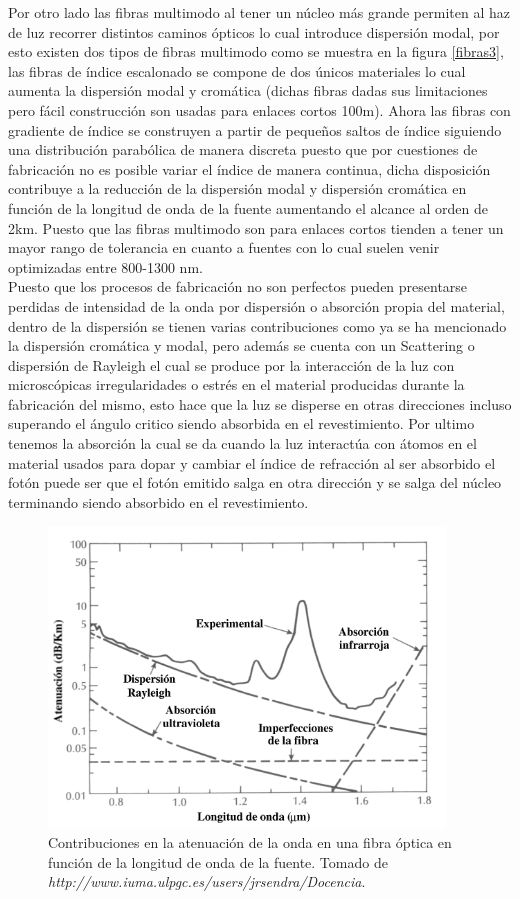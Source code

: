 Por otro lado las fibras multimodo al tener un núcleo más grande permiten al haz de luz recorrer distintos caminos ópticos lo cual introduce dispersión modal, por esto existen dos tipos de fibras multimodo como se muestra en la figura \ref{fibras3}, las fibras de índice escalonado se compone de dos únicos materiales lo cual aumenta la dispersión modal y cromática (dichas fibras dadas sus limitaciones pero fácil construcción son usadas para enlaces cortos 100m). Ahora las fibras con gradiente de índice se construyen a partir de pequeños saltos de índice siguiendo una distribución parabólica de manera discreta puesto que por cuestiones de fabricación no es posible variar el índice de manera continua, dicha disposición contribuye a la reducción de la dispersión modal y dispersión cromática en función de la longitud de onda de la fuente aumentando el alcance al orden de 2km. Puesto que las fibras multimodo son para enlaces cortos tienden a tener un mayor rango de tolerancia en cuanto a fuentes con lo cual suelen venir optimizadas entre 800-1300 nm.\\

Puesto que los procesos de fabricación no son perfectos pueden presentarse perdidas de intensidad de la onda por dispersión o absorción propia del material, dentro de la dispersión se tienen varias contribuciones como ya se ha mencionado la dispersión cromática y modal, pero además se cuenta con un Scattering o dispersión de Rayleigh el cual se produce por la interacción de la luz con microscópicas irregularidades o estrés en el material producidas durante la fabricación del mismo, esto hace que la luz se disperse en otras direcciones incluso superando el ángulo critico siendo absorbida en el revestimiento.
Por ultimo tenemos la absorción la cual se da cuando la luz interactúa con átomos en el material usados para dopar y cambiar el índice de refracción al ser absorbido el fotón puede ser que el fotón emitido salga en otra dirección y se salga del núcleo terminando siendo absorbido en el revestimiento.

\begin{figure}[H]
\centering
\includegraphics[width=0.56\linewidth]{Kap1/atenuacion.png}
\caption{Contribuciones en la atenuación de la onda en una fibra óptica en función de la longitud de onda de la fuente. Tomado de \textit{http://www.iuma.ulpgc.es/users/jrsendra/Docencia}.} 
\label{atenuacion}
\end{figure} 


